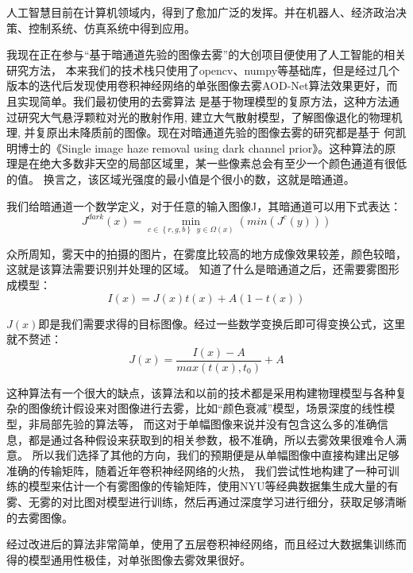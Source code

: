 \documentclass{article}
\begin{document}
人工智慧目前在计算机领域内，得到了愈加广泛的发挥。并在机器人、经济政治决策、控制系统、仿真系统中得到应用。\par
我现在正在参与“基于暗通道先验的图像去雾”的大创项目便使用了人工智能的相关研究方法，
本来我们的技术栈只使用了opencv、numpy等基础库，但是经过几个版本的迭代后发现使用卷积神经网络的单张图像去雾AOD-Net\citep{aod}算法效果更好，而且实现简单。我们最初使用的去雾算法
是基于物理模型的复原方法，这种方法通过研究大气悬浮颗粒对光的散射作用, 建立大气散射模型，了解图像退化的物理机理, 并复原出未降质前的图像。现在对暗通道先验的图像去雾的研究都是基于
何凯明博士的《Single image haze removal using dark channel prior》\citep{dehaze}。这种算法的原理是在绝大多数非天空的局部区域里，某一些像素总会有至少一个颜色通道有很低的值。
换言之，该区域光强度的最小值是个很小的数，这就是暗通道。\par
我们给暗通道一个数学定义，对于任意的输入图像J，其暗通道可以用下式表达：
\begin{equation}
J^{dark}\left ( x \right )=\min_{c\in\left \{ r,g,b \right \}\;\;y\in\Omega \left ( x \right )}\left ( min(J^{c}(y)) \right )
\end{equation}\par
众所周知，雾天中的拍摄的图片，在雾度比较高的地方成像效果较差，颜色较暗，这就是该算法需要识别并处理的区域。
知道了什么是暗通道之后，还需要雾图形成模型：
\begin{equation}
    I\left ( x \right )=J\left ( x \right )t\left ( x \right )+A\left ( 1-t\left ( x \right ) \right )    
\end{equation}\par
$J\left ( x \right )$即是我们需要求得的目标图像。经过一些数学变换后即可得变换公式，这里就不赘述：
\begin{equation}
    J\left ( x \right )=\frac{I\left ( x \right )-A}{max(t\left ( x \right ),t_{0})}+A
\end{equation}\par
这种算法有一个很大的缺点，该算法和以前的技术都是采用构建物理模型与各种复杂的图像统计假设来对图像进行去雾，比如“颜色衰减”模型，场景深度的线性模型，非局部先验的算法等，
而这对于单幅图像来说并没有包含这么多的准确信息，都是通过各种假设来获取到的相关参数，极不准确，所以去雾效果很难令人满意。
所以我们选择了其他的方向，我们的预期便是从单幅图像中直接构建出足够准确的传输矩阵，随着近年卷积神经网络的火热，
我们尝试性地构建了一种可训练的模型来估计一个有雾图像的传输矩阵，使用NYU等经典数据集生成大量的有雾、无雾的对比图对模型进行训练，然后再通过深度学习进行细分，获取足够清晰的去雾图像。\par
经过改进后的算法非常简单，使用了五层卷积神经网络，而且经过大数据集训练而得的模型通用性极佳，对单张图像去雾效果很好。\par
\end{document}
